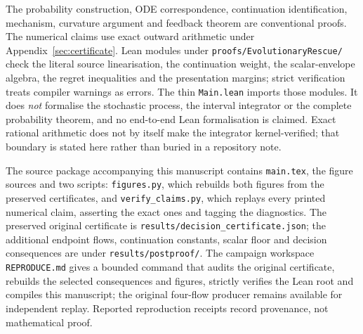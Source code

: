 \documentclass[11pt]{article}
\theoremstyle{remark}
\begin{document}
The probability construction, ODE correspondence, continuation identification,
mechanism, curvature argument and feedback theorem are conventional proofs. The
numerical claims use exact outward arithmetic under Appendix~\ref{sec:certificate}.
Lean modules under \texttt{proofs/EvolutionaryRescue/} check the literal source
linearisation, the continuation weight, the scalar-envelope algebra, the regret
inequalities and the presentation margins; strict verification treats compiler
warnings as errors. The thin \texttt{Main.lean} imports those modules. It does
\emph{not} formalise the stochastic process, the interval integrator or the
complete probability theorem, and no end-to-end Lean formalisation is claimed.
Exact rational arithmetic does not by itself make the integrator kernel-verified;
that boundary is stated here rather than buried in a repository note.

The source package accompanying this manuscript contains \texttt{main.tex}, the
figure sources and two scripts: \texttt{figures.py}, which rebuilds both figures
from the preserved certificates, and \texttt{verify\_claims.py}, which replays
every printed numerical claim, asserting the exact ones and tagging the
diagnostics. The preserved original certificate is
\texttt{results/decision\_certificate.json}; the additional endpoint flows,
continuation constants, scalar floor and decision consequences are under
\texttt{results/postproof/}. The campaign workspace
\texttt{REPRODUCE.md} gives a bounded command that audits the original
certificate, rebuilds the selected consequences and figures, strictly verifies
the Lean root and compiles this manuscript; the original four-flow producer
remains available for independent replay. Reported reproduction receipts record
provenance, not mathematical proof.
\end{document}
